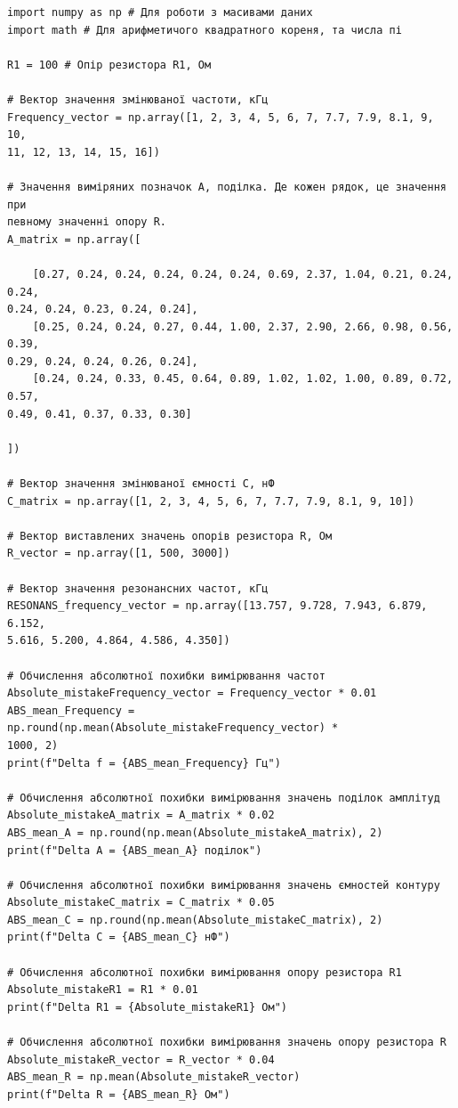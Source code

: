 \documentclass[12pt,a4paper]{article}
\begin{document}
    \small{

    \begin{verbatim}
import numpy as np # Для роботи з масивами даних
import math # Для арифметичого квадратного кореня, та числа пі

R1 = 100 # Опір резистора R1, Ом

# Вектор значення змінюваної частоти, кГц
Frequency_vector = np.array([1, 2, 3, 4, 5, 6, 7, 7.7, 7.9, 8.1, 9, 10,
11, 12, 13, 14, 15, 16])

# Значення виміряних позначок A, поділка. Де кожен рядок, це значення при
певному значенні опору R.
A_matrix = np.array([

    [0.27, 0.24, 0.24, 0.24, 0.24, 0.24, 0.69, 2.37, 1.04, 0.21, 0.24, 0.24,
0.24, 0.24, 0.23, 0.24, 0.24],
    [0.25, 0.24, 0.24, 0.27, 0.44, 1.00, 2.37, 2.90, 2.66, 0.98, 0.56, 0.39,
0.29, 0.24, 0.24, 0.26, 0.24],
    [0.24, 0.24, 0.33, 0.45, 0.64, 0.89, 1.02, 1.02, 1.00, 0.89, 0.72, 0.57,
0.49, 0.41, 0.37, 0.33, 0.30]

])

# Вектор значення змінюваної ємності C, нФ
С_matrix = np.array([1, 2, 3, 4, 5, 6, 7, 7.7, 7.9, 8.1, 9, 10])

# Вектор виставлених значень опорів резистора R, Ом
R_vector = np.array([1, 500, 3000])

# Вектор значення резонансних частот, кГц
RESONANS_frequency_vector = np.array([13.757, 9.728, 7.943, 6.879, 6.152,
5.616, 5.200, 4.864, 4.586, 4.350])

# Обчислення абсолютної похибки вимірювання частот
Absolute_mistakeFrequency_vector = Frequency_vector * 0.01
ABS_mean_Frequency = np.round(np.mean(Absolute_mistakeFrequency_vector) *
1000, 2)
print(f"Delta f = {ABS_mean_Frequency} Гц")

# Обчислення абсолютної похибки вимірювання значень поділок амплітуд
Absolute_mistakeA_matrix = A_matrix * 0.02
ABS_mean_A = np.round(np.mean(Absolute_mistakeA_matrix), 2)
print(f"Delta A = {ABS_mean_A} поділок")

# Обчислення абсолютної похибки вимірювання значень ємностей контуру
Absolute_mistakeC_matrix = С_matrix * 0.05
ABS_mean_C = np.round(np.mean(Absolute_mistakeC_matrix), 2)
print(f"Delta C = {ABS_mean_C} нФ")

# Обчислення абсолютної похибки вимірювання опору резистора R1
Absolute_mistakeR1 = R1 * 0.01
print(f"Delta R1 = {Absolute_mistakeR1} Ом")

# Обчислення абсолютної похибки вимірювання значень опору резистора R
Absolute_mistakeR_vector = R_vector * 0.04
ABS_mean_R = np.mean(Absolute_mistakeR_vector)
print(f"Delta R = {ABS_mean_R} Ом")


\end{verbatim}}
\end{document}
